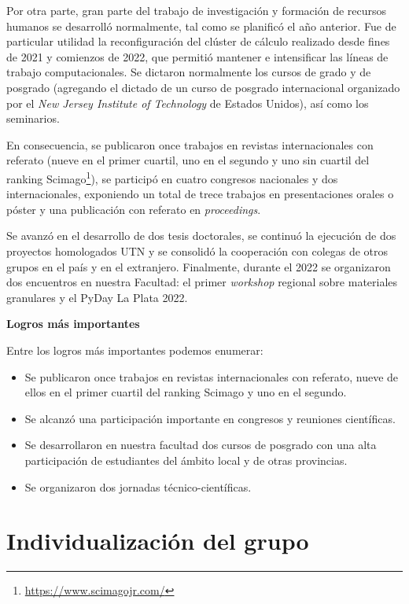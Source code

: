 \documentclass[a4paper,11pt,twoside,final,titlepage,onecolumn,openright]{report}
\begin{document}
Por otra parte, gran parte del trabajo de investigación y formación de recursos humanos se desarrolló normalmente, tal como se planificó el año anterior. Fue de particular utilidad la reconfiguración del clúster de cálculo realizado desde fines de 2021 y comienzos de 2022, que permitió mantener e intensificar las líneas de trabajo computacionales. Se dictaron normalmente los cursos de grado y de posgrado (agregando el dictado de un curso de posgrado internacional organizado por el \textit{New Jersey Institute of Technology} de Estados Unidos), así como los seminarios.

En consecuencia, se publicaron once trabajos en revistas internacionales con referato (nueve en el primer cuartil, uno en el segundo y uno sin cuartil del ranking Scimago\footnote{\href{https://www.scimagojr.com/}{https://www.scimagojr.com/}}), se participó en cuatro congresos nacionales y dos internacionales, exponiendo un total de trece trabajos en presentaciones orales o póster y una publicación con referato en \textit{proceedings}.

Se avanzó en el desarrollo de dos tesis doctorales, se continuó la ejecución de dos proyectos homologados UTN y se consolidó la cooperación con colegas de otros grupos en el país y en el extranjero. Finalmente, durante el 2022 se organizaron dos encuentros en nuestra Facultad: el primer \textit{workshop} regional sobre materiales granulares y el PyDay La Plata 2022.
\vspace{0.5cm}

{\bf Logros más importantes}

Entre los logros más importantes podemos enumerar:

\begin{itemize}
\item Se publicaron once trabajos en revistas internacionales con referato, nueve de ellos en el primer cuartil del ranking Scimago y uno en el segundo.
\item Se alcanzó una participación importante en congresos y reuniones científicas.
\item Se desarrollaron en nuestra facultad dos cursos de posgrado con una alta participación de estudiantes del ámbito local y de otras provincias.
\item Se organizaron dos jornadas técnico-científicas.
\end{itemize}


\section{Individualización del grupo}
\end{document}
